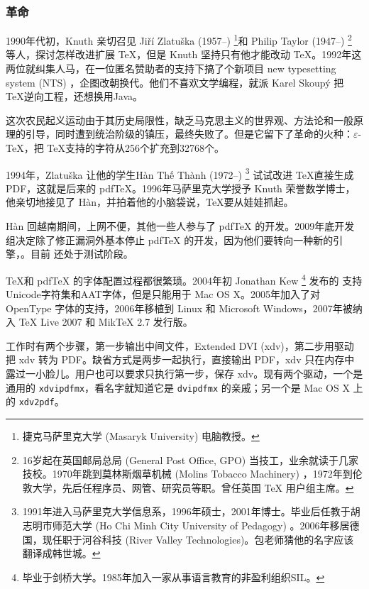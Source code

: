 \subsubsection{革命}

1990年代初，Knuth 亲切召见 Jiří Zlatuška (1957--)\indexZlatuska{} \footnote{捷克马萨里克大学 (Masaryk University) 电脑教授。}和 Philip Taylor (1947--)\indexTaylor{} \footnote{16岁起在英国邮局总局 (General Post Office, GPO) 当技工，业余就读于几家技校。1970年跳到莫林斯烟草机械 (Molins Tobacco Machinery) ，1972年到伦敦大学，先后任程序员、网管、研究员等职。曾任英国 TeX 用户组主席。} 等人，探讨怎样改进扩展 \TeX ，但是 Knuth 坚持只有他才能改动 \TeX。1992年这两位就纠集人马，在一位匿名赞助者的支持下搞了个新项目 new typesetting system (NTS) ，企图改朝换代。他们不喜欢文学编程，就派 Karel Skoupý 把 \TeX 逆向工程，还想换用Java。

这次农民起义运动由于其历史局限性，缺乏马克思主义的世界观、方法论和一般原理的引导，同时遭到统治阶级的镇压，最终失败了。但是它留下了革命的火种：$\varepsilon$-\TeX ，把 \TeX 支持的字符从256个扩充到32768个。

1994年，Zlatuška 让他的学生{\lmr Hàn Thế Thành} (1972--)\indexHan{} \footnote{1991年进入马萨里克大学信息系，1996年硕士，2001年博士。毕业后任教于胡志明市师范大学 (Ho Chi Minh City University of Pedagogy) 。2006年移居德国，现任职于河谷科技 (River Valley Technologies)。包老师猜他的名字应该翻译成韩世城。} 试试改进 \TeX 直接生成 PDF，这就是后来的 pdfTeX。1996年马萨里克大学授予 Knuth 荣誉数学博士，他亲切地接见了 Hàn，并拍着他的小脑袋说，\TeX 要从娃娃抓起。

Hàn 回越南期间，上网不便，其他一些人参与了 pdfTeX 的开发。2009年底开发组决定除了修正漏洞外基本停止 pdfTeX 的开发，因为他们要转向一种新的引擎，\LuaTeX。目前 \LuaTeX 还处于测试阶段。

\TeX 和 pdfTeX 的字体配置过程都很繁琐。2004年初 Jonathan Kew\indexKew{} \footnote{毕业于剑桥大学。1985年加入一家从事语言教育的非盈利组织SIL\indexSIL。} 发布的 \XeTeX 支持Unicode字符集和AAT字体，但是只能用于 Mac OS X。2005年加入了对 OpenType 字体的支持，2006年移植到 Linux 和 Microsoft Windows，2007年被纳入 TeX Live 2007 和 MikTeX 2.7 发行版。

\XeTeX 工作时有两个步骤，第一步输出中间文件，Extended DVI (xdv)，第二步用驱动把 xdv 转为 PDF。缺省方式是两步一起执行，直接输出 PDF，xdv 只在内存中露过一小脸儿。用户也可以要求只执行第一步，保存 xdv。\XeTeX 现有两个驱动，一个是通用的 \texttt{xdvipdfmx}，看名字就知道它是 \texttt{dvipdfmx} 的亲戚；另一个是 Mac OS X 上的 \texttt{xdv2pdf}。

